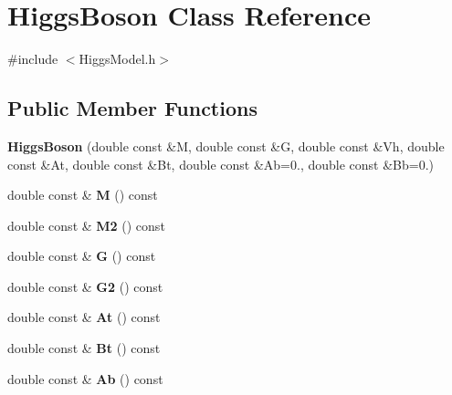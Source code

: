\hypertarget{classHiggsBoson}{\section{Higgs\-Boson Class Reference}
\label{classHiggsBoson}
}


{\ttfamily \#include $<$Higgs\-Model.\-h$>$}

\subsection*{Public Member Functions}
\begin{DoxyCompactItemize}
\item 
\hypertarget{classHiggsBoson_aef7e66e7df2850281117c8065f86266a}{{\bfseries Higgs\-Boson} (double const \&M, double const \&G, double const \&Vh, double const \&At, double const \&Bt, double const \&Ab=0., double const \&Bb=0.)}\label{classHiggsBoson_aef7e66e7df2850281117c8065f86266a}

\item 
\hypertarget{classHiggsBoson_a3a18ef5458760d0b4fe6f7f67847f200}{double const \& {\bfseries M} () const }\label{classHiggsBoson_a3a18ef5458760d0b4fe6f7f67847f200}

\item 
\hypertarget{classHiggsBoson_a1cbc3cabab562910857fd24602c88029}{double const \& {\bfseries M2} () const }\label{classHiggsBoson_a1cbc3cabab562910857fd24602c88029}

\item 
\hypertarget{classHiggsBoson_abee4eef942de0a4088166fa59b09054e}{double const \& {\bfseries G} () const }\label{classHiggsBoson_abee4eef942de0a4088166fa59b09054e}

\item 
\hypertarget{classHiggsBoson_aee7be204e7532152c97f6115632c76ac}{double const \& {\bfseries G2} () const }\label{classHiggsBoson_aee7be204e7532152c97f6115632c76ac}

\item 
\hypertarget{classHiggsBoson_a56fe580ffe65572242ba5170c5f95126}{double const \& {\bfseries At} () const }\label{classHiggsBoson_a56fe580ffe65572242ba5170c5f95126}

\item 
\hypertarget{classHiggsBoson_a0919c5fc894bb010490229271e781bdd}{double const \& {\bfseries Bt} () const }\label{classHiggsBoson_a0919c5fc894bb010490229271e781bdd}

\item 
\hypertarget{classHiggsBoson_a15a4d40ec981360f0c1033d5c7156c99}{double const \& {\bfseries Ab} () const }\label{classHiggsBoson_a15a4d40ec981360f0c1033d5c7156c99}


\end{DoxyCompactItemize}
